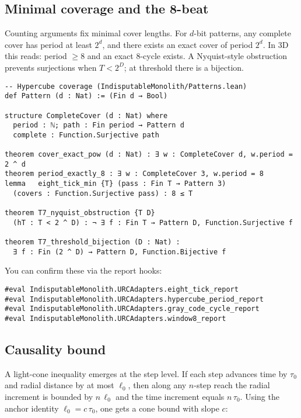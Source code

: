 \documentclass[11pt,a4paper,twoside]{article}
\numberwithin{equation}{section}
\theoremstyle{customthm}
\theoremstyle{customdef}
\theoremstyle{customrem}
\begin{document}
\subsection{Minimal coverage and the 8-beat}

Counting arguments fix minimal cover lengths. For $d$-bit patterns, any complete cover has period at least $2^d$, and there exists an exact cover of period $2^d$. In 3D this reads: period $\ge 8$ and an exact 8-cycle exists. A Nyquist-style obstruction prevents surjections when $T<2^D$; at threshold there is a bijection.

\begin{lstlisting}
-- Hypercube coverage (IndisputableMonolith/Patterns.lean)
def Pattern (d : Nat) := (Fin d → Bool)

structure CompleteCover (d : Nat) where
  period : ℕ; path : Fin period → Pattern d
  complete : Function.Surjective path

theorem cover_exact_pow (d : Nat) : ∃ w : CompleteCover d, w.period = 2 ^ d
theorem period_exactly_8 : ∃ w : CompleteCover 3, w.period = 8
lemma   eight_tick_min {T} (pass : Fin T → Pattern 3)
  (covers : Function.Surjective pass) : 8 ≤ T

theorem T7_nyquist_obstruction {T D}
  (hT : T < 2 ^ D) : ¬ ∃ f : Fin T → Pattern D, Function.Surjective f

theorem T7_threshold_bijection (D : Nat) :
  ∃ f : Fin (2 ^ D) → Pattern D, Function.Bijective f
\end{lstlisting}

You can confirm these via the report hooks:

\begin{lstlisting}
#eval IndisputableMonolith.URCAdapters.eight_tick_report
#eval IndisputableMonolith.URCAdapters.hypercube_period_report
#eval IndisputableMonolith.URCAdapters.gray_code_cycle_report
#eval IndisputableMonolith.URCAdapters.window8_report
\end{lstlisting}

\subsection{Causality bound}

A light-cone inequality emerges at the step level. If each step advances time by $\tau_0$ and radial distance by at most $\ell_0$, then along any $n$-step reach the radial increment is bounded by $n\,\ell_0$ and the time increment equals $n\,\tau_0$. Using the anchor identity $\ell_0 = c\,\tau_0$, one gets a cone bound with slope $c$:
\end{document}
